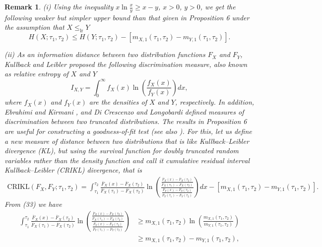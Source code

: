 \documentclass[11pt]{article}
\newtheorem{remark}{Remark}
\begin{document}
 
\begin{remark}
	(i) Using the inequality $x\ln \frac{x}{y} \geq x - y$, $x>0$, $y>0$, we get the following weaker but simpler upper bound than that given in Proposition 6 under the assumption that $X \leq_{\text{lr}} Y$
	$$ \textstyle H(X;\tau_1,\tau_2 ) \leq H(Y;\tau_1,\tau_2 ) - [m_{X,1}(\tau_1,\tau_2 ) - m_{Y,1}(\tau_1,\tau_2 )]. $$
	
	\noindent (ii) As an information distance between two distribution functions $F_X$ and $F_Y$, Kullback and Leibler \cite{Kullback1951} proposed the following discrimination measure, also known as relative entropy of $X$ and $Y$
	$$ \textstyle I_{X,Y} = \int_0^\infty f_X(x)\ln \left(\frac{f_X(x)}{f_Y(x)}\right) dx, $$
	where $f_X(x)$ and $f_Y(x)$ are the densities of $X$ and $Y$, respectively. In addition, Ebrahimi and Kirmani \cite{Ebrahimi1996b}, and Di Crescenzo and Longobardi \cite{DiCrescenzo2004} defined measures of discrimination between two truncated distributions. The results in Proposition 6 are useful for constructing a goodness-of-fit test (see also \cite{Baratpour2012}). For this, let us define a new measure of distance between two distributions that is like Kullback–Leibler divergence (KL), but using the survival function for doubly truncated random variables rather than the density function and call it cumulative residual interval Kullback–Leibler (CRIKL) divergence, that is
	\begin{align*}
		\textstyle \text{CRIKL}(F_X,F_Y;\tau_1,\tau_2 ) = \textstyle \int_{\tau_1}^{\tau_2} \frac{\overline{F}_X(x)-\overline{F}_X(\tau_2)}{\overline{F}_X(\tau_1)-\overline{F}_X(\tau_2)} \ln\left( \frac{ \frac{\overline{F}_X(x)-\overline{F}_X(\tau_2)}{\overline{F}_X(\tau_1)-\overline{F}_X(\tau_2)} }{ \frac{\overline{F}_Y(x)-\overline{F}_Y(\tau_2)}{\overline{F}_Y(\tau_1)-\overline{F}_Y(\tau_2)} } \right) dx - [m_{X,1}(\tau_1,\tau_2 ) - m_{Y,1}(\tau_1,\tau_2 )].
	\end{align*} 
	From (33) we have
	\begin{align*}
		\textstyle \int_{\tau_1}^{\tau_2} \frac{\overline{F}_X(x)-\overline{F}_X(\tau_2)}{\overline{F}_X(\tau_1)-\overline{F}_X(\tau_2)} \ln\left( \frac{ \frac{\overline{F}_X(x)-\overline{F}_X(\tau_2)}{\overline{F}_X(\tau_1)-\overline{F}_X(\tau_2)} }{ \frac{\overline{F}_Y(x)-\overline{F}_Y(\tau_2)}{\overline{F}_Y(\tau_1)-\overline{F}_Y(\tau_2)} } \right) & \geq m_{X,1}(\tau_1,\tau_2 )\ln\left( \frac{m_{X,1}(\tau_1,\tau_2 )}{m_{Y,1}(\tau_1,\tau_2 )} \right) \\
		& \textstyle \geq m_{X,1}(\tau_1,\tau_2 ) - m_{Y,1}(\tau_1,\tau_2 ),

\end{align*}
\end{remark}
\end{document}

